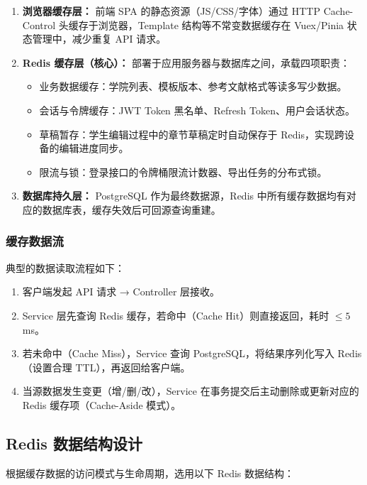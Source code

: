 \documentclass{../../softeng}
\begin{document}
\begin{enumerate}
    \item \textbf{浏览器缓存层：} 前端 SPA 的静态资源（JS/CSS/字体）通过 HTTP Cache-Control 头缓存于浏览器，Template 结构等不常变数据缓存在 Vuex/Pinia 状态管理中，减少重复 API 请求。
    \item \textbf{Redis 缓存层（核心）：} 部署于应用服务器与数据库之间，承载四项职责：
    \begin{itemize}
        \item 业务数据缓存：学院列表、模板版本、参考文献格式等读多写少数据。
        \item 会话与令牌缓存：JWT Token 黑名单、Refresh Token、用户会话状态。
        \item 草稿暂存：学生编辑过程中的章节草稿定时自动保存于 Redis，实现跨设备的编辑进度同步。
        \item 限流与锁：登录接口的令牌桶限流计数器、导出任务的分布式锁。
    \end{itemize}
    \item \textbf{数据库持久层：} PostgreSQL 作为最终数据源，Redis 中所有缓存数据均有对应的数据库表，缓存失效后可回源查询重建。
\end{enumerate}

\subsubsection{缓存数据流}

典型的数据读取流程如下：

\begin{enumerate}
    \item 客户端发起 API 请求 → Controller 层接收。
    \item Service 层先查询 Redis 缓存，若命中（Cache Hit）则直接返回，耗时 $\le 5$ms。
    \item 若未命中（Cache Miss），Service 查询 PostgreSQL，将结果序列化写入 Redis（设置合理 TTL），再返回给客户端。
    \item 当源数据发生变更（增/删/改），Service 在事务提交后主动删除或更新对应的 Redis 缓存项（Cache-Aside 模式）。
\end{enumerate}

\subsection{Redis 数据结构设计}

根据缓存数据的访问模式与生命周期，选用以下 Redis 数据结构：
\end{document}
